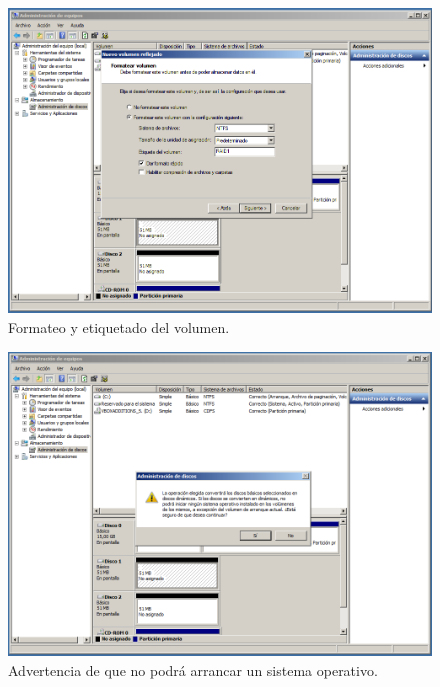 \documentclass[a4paper,titlepage,12pt]{scrartcl}	%
\numberwithin{figure}{section} %
\numberwithin{table}{section} %
\begin{document}
	\begin{figure}[H]
		\centering
		\includegraphics[scale=0.38]{./Imagenes/WSRAIDPaso5.png}
		\caption[Formateo y etiquetado del volumen.]{Formateo y etiquetado del volumen.}
		\label{WSRAIDPaso5}
	\end{figure}
	
	\begin{figure}[H]
		\centering
		\includegraphics[scale=0.38]{./Imagenes/WSRAIDPaso6.png}
		\caption[Advertencia de que no podrá arrancar un sistema operativo.]{Advertencia de que no podrá arrancar un sistema operativo.}
		\label{WSRAIDPaso6}
	\end{figure}	
	
\end{document}
